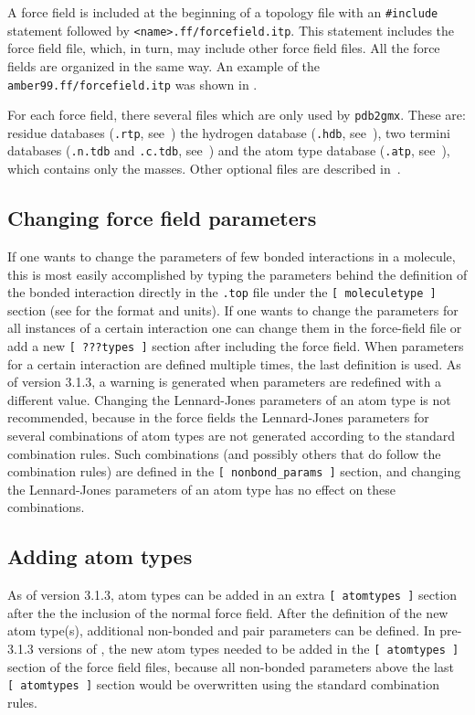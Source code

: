 A force field is included at the beginning of a topology file with an
{\tt \#include} statement followed by {\tt <name>.ff/forcefield.itp}.
This statement includes the force field file,
which, in turn, may include other force field files. All the force fields
are organized in the same way. An example of the
{\tt amber99.ff/forcefield.itp} was shown in .

For each force field, there several files which are only used by {\tt pdb2gmx}.
These are: residue databases ({\tt .rtp}, see~)
the hydrogen database ({\tt .hdb}, see~), two termini databases
({\tt .n.tdb} and {\tt .c.tdb}, see~) and
the atom type database ({\tt .atp}, see~), which contains only the masses.  Other optional
files are described in~.


\subsection{Changing force field parameters}
If one wants to change the parameters of few bonded interactions in
a molecule, this is most easily accomplished by typing the parameters
behind the definition of the bonded interaction directly in the {\tt *.top} file 
under the {\tt [~moleculetype~]} section (see  for the format
and units).
If one wants to change the parameters for all instances of a certain
interaction one can change them in the force-field file or add a
new {\tt [~???types~]} section after including the force field.
When parameters for a certain interaction are defined multiple times,
the last definition is used. As of {\gromacs} version 3.1.3, a warning is
generated when parameters are redefined with a different value.
Changing the Lennard-Jones parameters of an atom type is not
recommended, because in the {\gromos} force fields
the Lennard-Jones parameters for several combinations of atom types
are not generated according to the standard combination rules.
Such combinations (and possibly others that do follow the
combination rules) are defined in the {\tt [~nonbond_params~]}
section, and changing the Lennard-Jones parameters of an atom type
has no effect on these combinations.

\subsection{Adding atom types}
As of {\gromacs} version 3.1.3, atom types can be added in an extra
{\tt [~atomtypes~]} section after the the inclusion of the normal
force field. After the definition of the new atom type(s), additional
non-bonded and pair parameters can be defined.
In pre-3.1.3 versions of {\gromacs}, the new atom types needed to be
added in the {\tt [~atomtypes~]} section of the force field files,
because all non-bonded parameters above the last {\tt [~atomtypes~]}
section would be overwritten using the standard combination rules.

